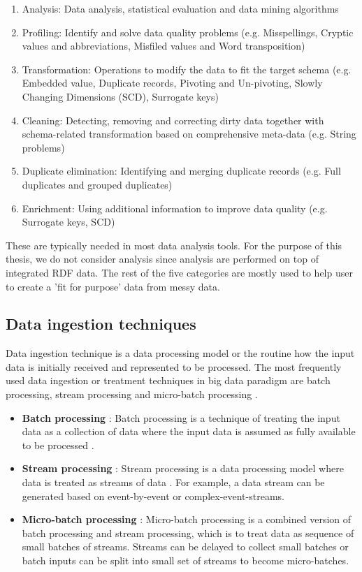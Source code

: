 \begin{enumerate}
\item Analysis: Data analysis, statistical evaluation and data mining algorithms
\item Profiling: Identify and solve data quality problems (e.g. Misspellings, Cryptic values and abbreviations, Misfiled values and Word transposition) \cite{datacleaningprobsandapproaches}
\item Transformation: Operations to modify the data to fit the target schema (e.g. Embedded value,  Duplicate records, Pivoting and Un-pivoting, Slowly Changing Dimensions (SCD), Surrogate keys) \cite{datacleaningprobsandapproaches}\cite{ETL}
\item Cleaning: Detecting, removing and correcting dirty data together with schema-related transformation based on comprehensive meta-data (e.g. String problems) \cite{datacleaningprobsandapproaches}
\item Duplicate elimination: Identifying and merging duplicate records (e.g. Full duplicates and grouped duplicates)
\item Enrichment: Using additional information to improve data quality (e.g. Surrogate keys, SCD) \cite{ETL}
\end{enumerate}
\noindent These are typically needed in most data analysis tools. For the purpose of this thesis, we do not consider analysis since analysis are performed on top of integrated RDF data. The rest of the five categories are mostly used to help user to create a 'fit for purpose' data from messy data. 
\subsection{Data ingestion techniques}
Data ingestion technique is a data processing model or the routine how the input data is initially received and represented to be processed. The most frequently used data ingestion or treatment techniques in big data paradigm are batch processing, stream processing and micro-batch processing \cite{dataflow}. 
\begin{itemize}
\item \textbf{Batch processing} : Batch processing is a technique of treating the input data as a collection of data where the input data is assumed as fully available to be processed \cite{Sims-387}.
\item \textbf{Stream processing} :  Stream processing is a data processing model where data is treated as streams of data \cite{beyondbatchprocessing}. For example, a data stream can be generated based on event-by-event or complex-event-streams.
\item \textbf{Micro-batch processing} : Micro-batch processing is a combined version of batch processing and stream processing, which is to treat data as sequence of small batches of streams. Streams can be delayed to collect small batches or batch inputs can be split into small set of streams to become micro-batches. 
\end{itemize}
